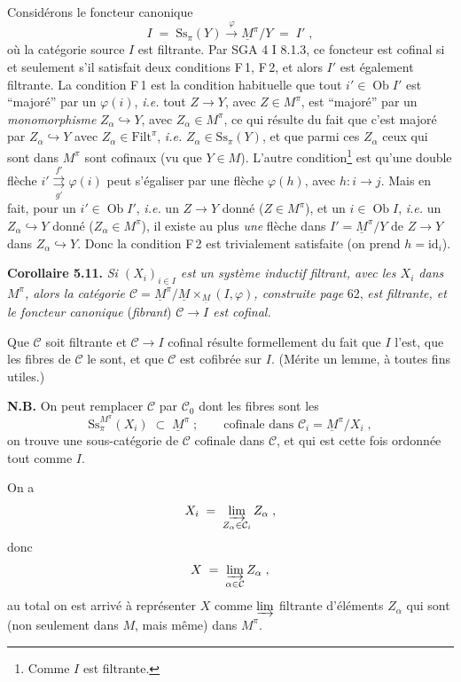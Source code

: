\documentclass[11pt]{article}
\newcommand{\printedpage}[1]{\marginpar{\footnotesize p.~#1}}
\newcommand{\msp}[1]{\marginpar{\footnotesize [#1]}}
\newcommand{\Filt}{\mathrm{Filt}}
\newcommand{\Ob}{\operatorname{Ob}}
\newcommand{\Ss}{\mathrm{Ss}}
\newcommand{\Ci}{\mathcal{C}}
\begin{document}
Considérons le foncteur canonique
\[
I \;=\; \Ss_\pi(Y) \xrightarrow{\;\varphi\;} \underline{M}^\pi/Y \;=\; I' \;,
\]
où la catégorie source $I$ est filtrante. Par SGA 4 I 8.1.3, ce foncteur est cofinal si et seulement s'il satisfait deux conditions F\,1, F\,2, et alors $I'$ est également filtrante. La condition F\,1 est la condition habituelle que tout $i' \in \Ob I'$ est “majoré” par un $\varphi(i)$, \textit{i.e.} tout $Z \longrightarrow Y$, avec $Z \in M^\pi$, est “majoré” par un \textit{monomorphisme} $Z_\alpha \hookrightarrow Y$, avec $Z_\alpha \in M^\pi$, ce qui résulte du fait que c'est majoré par $Z_\alpha \hookrightarrow Y$ avec $Z_\alpha \in \Filt^\pi$, \textit{i.e.} $Z_\alpha \in \Ss_\pi(Y)$, et que parmi ces $Z_\alpha$ ceux qui sont dans $M^\pi$ sont cofinaux (vu que $Y \in M$). L'autre condition\footnote[23]{Comme $I$ est filtrante.} est qu'une double flèche $i' \overset{f'}{\underset{g'}{\rightrightarrows}} \varphi(i)$ peut
\msp{page 64}
s'égaliser par une flèche $\varphi(h)$, avec $h : i \longrightarrow j$. Mais en fait, pour un $i' \in \Ob I'$, \textit{i.e.} un $Z \longrightarrow Y$ donné ($Z \in M^\pi$), et un $i \in \Ob I$, \textit{i.e.} un $Z_\alpha \hookrightarrow Y$ donné ($Z_\alpha \in M^\pi$), il existe au plus \textit{une} flèche dans $I' = \underline{M}^\pi/Y$ de $Z \longrightarrow Y$ dans $Z_\alpha \hookrightarrow Y$. Donc la condition F\,2 est trivialement satisfaite (on prend $h = \mathrm{id}_i$).

\textbf{Corollaire 5.11.} \textit{Si $(X_i)_{i \in I}$ est un système inductif filtrant, avec les $X_i$ dans $M^\pi$, alors la catégorie $\Ci = \underline{M}^\pi/\underline{M} \times_{\underline{M}} (I,\varphi)$, construite page} 62, \textit{est filtrante, et le foncteur canonique} (\textit{fibrant}) \textit{$\Ci \longrightarrow I$ est cofinal.}

Que $\Ci$ soit filtrante et $\Ci \longrightarrow I$ cofinal résulte formellement du fait que $I$ l'est, que les fibres de $\Ci$ le sont, et que $\Ci$ est cofibrée sur $I$. (Mérite un lemme, à toutes fins utiles.)

\textbf{N.B.} On peut remplacer $\Ci$ par $\Ci_0$ dont les fibres sont les
\[
\Ss_\pi^{M^\pi}(X_i) \;\subset\; \underline{M}^\pi \;; \qquad \text{cofinale dans } \Ci_i = \underline{M}^\pi/X_i \;,
\]
\msp{page 65}
on trouve une sous-catégorie de $\Ci$ cofinale dans $\Ci$, et qui est cette fois ordonnée tout comme $I$.

\printedpage{38}
On a
\[
X_i \;=\; \varinjlim_{Z_\alpha \in \Ci_i} Z_\alpha \;,
\]
donc
\[
X \;=\; \varinjlim_{\alpha \in \Ci} Z_\alpha \;,
\]
au total on est arrivé à représenter $X$ comme $\varinjlim$ filtrante d'éléments $Z_\alpha$ qui sont (non seulement dans $M$, mais même) dans $M^\pi$.
\end{document}
